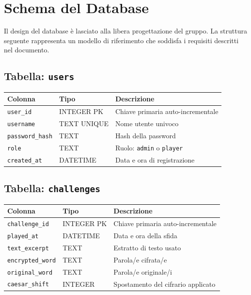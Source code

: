 \documentclass[12pt, a4paper]{article}
\newcommand{\code}[1]{\texttt{#1}}
\begin{document}
\newpage
\section{Schema del Database}

Il design del database è lasciato alla libera progettazione del gruppo. La struttura seguente rappresenta un modello di riferimento che soddisfa i requisiti descritti nel documento.

\subsection{Tabella: \texttt{users}}

\begin{longtable}{|p{3.5cm}|p{2.5cm}|p{7cm}|}
    \hline
    \rowcolor{primaryBlue!20}
    \textbf{Colonna} & \textbf{Tipo} & \textbf{Descrizione} \\
    \hline
    \endhead
    \code{user\_id} & INTEGER PK & Chiave primaria auto-incrementale \\
    \hline
    \code{username} & TEXT UNIQUE & Nome utente univoco \\
    \hline
    \code{password\_hash} & TEXT & Hash della password \\
    \hline
    \code{role} & TEXT & Ruolo: \code{admin} o \code{player} \\
    \hline
    \code{created\_at} & DATETIME & Data e ora di registrazione \\
    \hline
\end{longtable}

\subsection{Tabella: \texttt{challenges}}

\begin{longtable}{|p{3.5cm}|p{2.5cm}|p{7cm}|}
    \hline
    \rowcolor{primaryBlue!20}
    \textbf{Colonna} & \textbf{Tipo} & \textbf{Descrizione} \\
    \hline
    \endhead
    \code{challenge\_id} & INTEGER PK & Chiave primaria auto-incrementale \\
    \hline
    \code{played\_at} & DATETIME & Data e ora della sfida \\
    \hline
    \code{text\_excerpt} & TEXT & Estratto di testo usato \\
    \hline
    \code{encrypted\_word} & TEXT & Parola/e cifrata/e \\
    \hline
    \code{original\_word} & TEXT & Parola/e originale/i \\
    \hline
    \code{caesar\_shift} & INTEGER & Spostamento del cifrario applicato \\
    \hline
\end{longtable}
\end{document}
